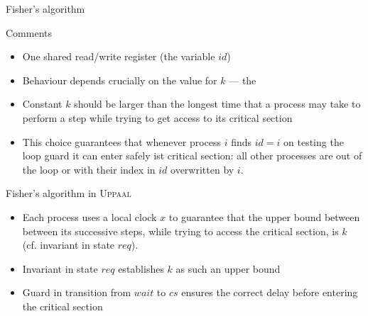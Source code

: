 \documentclass[aspectratio=169]{beamer}
\begin{document}
\begin{slide}{Fisher's algorithm}
\small
\begin{block}{Comments}
\begin{itemize}
\item One shared read/write register (the variable $id$)
\item Behaviour depends crucially on the value for $k$ --- the 
\item Constant $k$ should be \alert{larger than the longest time that a process may take to perform a step while trying to get access to its critical section} 
\item This choice guarantees that whenever process $i$ finds $id = i$ on testing the loop guard it can enter safely ist critical section: \alert{all} other processes are out of the loop or with their index in $id$ overwritten by $i$.
\end{itemize}
\end{block}
\end{slide}

\begin{slide}{Fisher's algorithm in \textsc{Uppaal}}
\small
\centering



\begin{itemize}
\item Each process uses a local clock $x$ to guarantee that the upper bound between between its successive steps, while
trying to access the critical section, is $k$ (cf. \alert{invariant} in state $req$).
\item \alert{Invariant} in state $req$ establishes $k$ as such an upper bound
\item \alert{Guard} in transition from $wait$ to $cs$ ensures the correct delay before entering the critical section
\end{itemize}
\end{slide}
\end{document}
